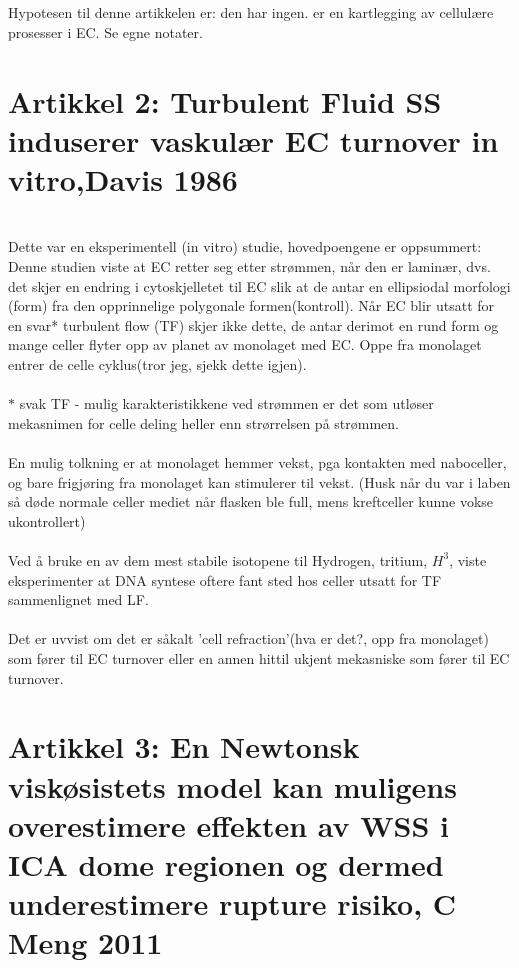 \documentclass{article}
\begin{document}
\\
\\ Hypotesen til denne artikkelen er: den har ingen. er en kartlegging av cellulære prosesser i EC.
Se egne notater. 

\section{Artikkel 2: Turbulent Fluid SS induserer vaskulær EC turnover in vitro,Davis 1986}

\\Dette var en eksperimentell (in vitro) studie, hovedpoengene er oppsummert: 
\\Denne studien viste at EC retter seg etter strømmen, når den er laminær, dvs. det skjer en endring i cytoskjelletet til EC slik at de antar en ellipsiodal morfologi (form) fra den opprinnelige polygonale formen(kontroll). 
Når EC blir utsatt for en svar* turbulent flow (TF) skjer ikke dette, de antar derimot en rund form og mange celler flyter opp av planet av monolaget med EC. 
Oppe fra monolaget entrer de celle cyklus(tror jeg, sjekk dette igjen).
\\
\\$*$ svak TF -  mulig karakteristikkene ved strømmen er det som utløser mekasnimen for celle deling heller enn strørrelsen på strømmen.
\\
\\En mulig tolkning er at monolaget hemmer vekst, pga kontakten med naboceller, og bare frigjøring fra monolaget kan stimulerer til vekst. 
(Husk når du var i laben så døde normale celler mediet når flasken ble full, mens kreftceller kunne vokse ukontrollert)
\\
\\Ved å bruke en av dem mest stabile isotopene til Hydrogen, tritium, $H^{3}$, viste eksperimenter at DNA syntese oftere fant sted hos celler utsatt for TF sammenlignet med LF. 
\\
\\Det er uvvist om det er såkalt 'cell refraction'(hva er det?, opp fra monolaget) som fører til EC turnover eller en annen hittil ukjent mekasniske som fører til EC turnover. 


\section{Artikkel 3: En Newtonsk viskøsistets model kan muligens overestimere effekten av WSS i ICA dome regionen og dermed underestimere rupture risiko, C
Meng 2011 }
\end{document}
